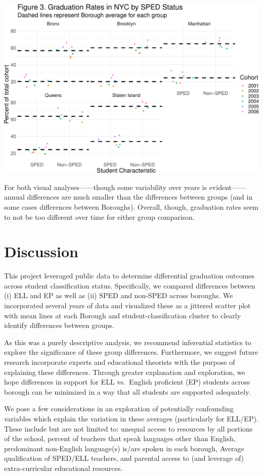 \documentclass[
  english,
  man, fleqn, noextraspace]{apa6}
\begin{document}
\includegraphics{EDLD_651_Final_Project_Draft_files/figure-latex/graph_results_SPED-1.pdf}

For both visual analyses------though some variability over years is evident------annual differences are much smaller than the differences between groups (and in some cases differences between Boroughs). Overall, though, graduation rates seem to not be too different over time for either group comparison.

\hypertarget{discussion}{%
\section{Discussion}\label{discussion}}

This project leveraged public data to determine differential graduation outcomes across student classification status. Specifically, we compared differences between (i) ELL and EP as well as (ii) SPED and non-SPED across boroughs. We incorporated several years of data and visualized these as a jittered scatter plot with mean lines at each Borough and student-classification cluster to clearly identify differences between groups.

As this was a purely descriptive analysis, we recommend inferential statistics to explore the significance of these group differences. Furthermore, we suggest future research incorporate experts and educational theorists with the purpose of explaining these differences. Through greater explanation and exploration, we hope differences in support for ELL vs.~English proficient (EP) students across borough can be minimized in a way that all students are supported adequately.

We pose a few considerations in an exploration of potentially confounding variables which explain the variation in these averages (particularly for ELL/EP). These include but are not limited to: unequal access to resources by all portions of the school, percent of teachers that speak languages other than English, predominant non-English language(s) is/are spoken in each borough, Average qualification of SPED/ELL teachers, and parental access to (and leverage of) extra-curricular educational resources.
\end{document}
